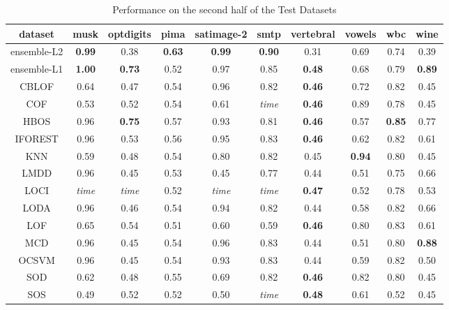 \begin{table*}[!b]
\renewcommand{\arraystretch}{1.25}
\caption{Performance on the second half of the Test Datasets}
\label{table:results:test-performance-2}
\centering
\begin{tabular}{|c|c|c|c|c|c|c|c|c|c|}
\hline
\textbf{dataset} & \textbf{musk} & \textbf{optdigits} & \textbf{pima} & \textbf{satimage-2} & \textbf{smtp} & \textbf{vertebral} & \textbf{vowels} & \textbf{wbc} & \textbf{wine} \\
\hline
ensemble-L2 & \bfseries 0.99 & 0.38 & \bfseries 0.63 & \bfseries 0.99 & \bfseries 0.90 & 0.31 & 0.69 & 0.74 & 0.39 \\
\hline
ensemble-L1 & \bfseries 1.00 & \bfseries 0.73 & 0.52 & 0.97 & 0.85 & \bfseries 0.48 & 0.68 & 0.79 & \bfseries 0.89 \\
\hline
CBLOF & 0.64 & 0.47 & 0.54 & 0.96 & 0.82 & \bfseries 0.46 & 0.72 & 0.82 & 0.45 \\
\hline
COF & 0.53 & 0.52 & 0.54 & 0.61 & \textit{time} & \bfseries 0.46 & 0.89 & 0.78 & 0.45 \\
\hline
HBOS & 0.96 & \bfseries 0.75 & 0.57 & 0.93 & 0.81 & \bfseries 0.46 & 0.57 & \bfseries 0.85 & 0.77 \\
\hline
IFOREST & 0.96 & 0.53 & 0.56 & 0.95 & 0.83 & \bfseries 0.46 & 0.62 & 0.82 & 0.61 \\
\hline
KNN & 0.59 & 0.48 & 0.54 & 0.80 & 0.82 & 0.45 & \bfseries 0.94 & 0.80 & 0.45 \\
\hline
LMDD & 0.96 & 0.45 & 0.53 & 0.45 & 0.77 & 0.44 & 0.51 & 0.75 & 0.66 \\
\hline
LOCI & \textit{time} & \textit{time} & 0.52 & \textit{time} & \textit{time} & \bfseries 0.47 & 0.52 & 0.78 & 0.53 \\
\hline
LODA & 0.96 & 0.46 & 0.54 & 0.94 & 0.82 & 0.44 & 0.58 & 0.82 & 0.66 \\
\hline
LOF & 0.65 & 0.54 & 0.51 & 0.60 & 0.59 & \bfseries 0.46 & 0.80 & 0.83 & 0.61 \\
\hline
MCD & 0.96 & 0.45 & 0.54 & 0.96 & 0.83 & 0.44 & 0.51 & 0.80 & \bfseries 0.88 \\
\hline
OCSVM & 0.96 & 0.45 & 0.54 & 0.93 & 0.83 & 0.44 & 0.59 & 0.82 & 0.50 \\
\hline
SOD & 0.62 & 0.48 & 0.55 & 0.69 & 0.82 & \bfseries 0.46 & 0.82 & 0.80 & 0.45 \\
\hline
SOS & 0.49 & 0.52 & 0.52 & 0.50 & \textit{time} & \bfseries 0.48 & 0.61 & 0.52 & 0.45 \\
\hline
\end{tabular}
\end{table*}

